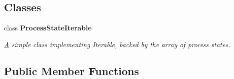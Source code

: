 \subsection*{Classes}
\begin{DoxyCompactItemize}
\item 
class {\bfseries Process\+State\+Iterable}
\begin{DoxyCompactList}\small\item\em \hyperlink{structA}{A} simple class implementing Iterable, backed by the array of process states. \end{DoxyCompactList}\end{DoxyCompactItemize}
\subsection*{Public Member Functions}
